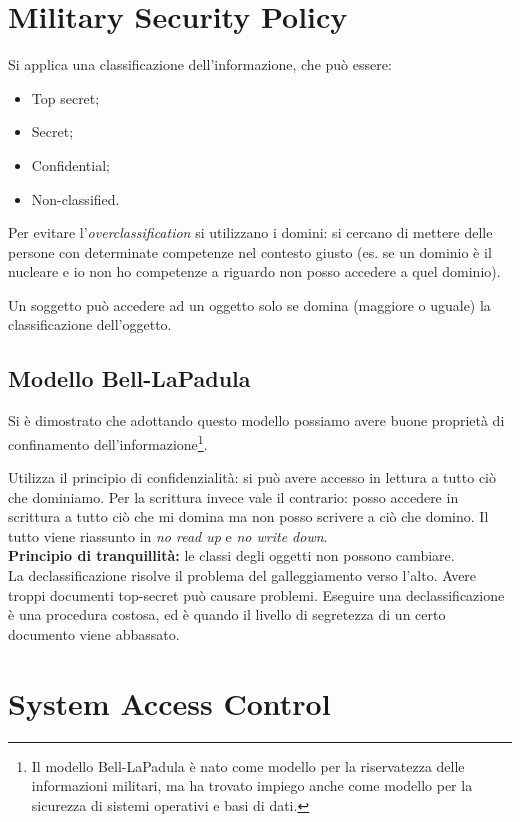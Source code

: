 \section{Military Security Policy}

Si applica una classificazione dell'informazione, che può essere:
\begin{itemize}
 \item Top secret;
 \item Secret;
 \item Confidential;
 \item Non-classified.
\end{itemize}

Per evitare l'\textit{overclassification} si utilizzano i domini: si cercano
di mettere delle persone con determinate competenze nel contesto giusto (es.
se un dominio è il nucleare e io non ho competenze a riguardo non posso
accedere a quel dominio).

Un soggetto può accedere ad un oggetto solo se domina (maggiore o uguale) la
classificazione dell'oggetto.

\subsection{Modello Bell-LaPadula}

Si è dimostrato che adottando questo modello possiamo avere buone proprietà di
confinamento dell'informazione\footnote{Il modello Bell-LaPadula è nato
come modello per la riservatezza delle informazioni militari, ma ha
trovato impiego anche come modello per la sicurezza di sistemi operativi
e basi di dati.}.

Utilizza il principio di confidenzialità: si può avere accesso in lettura a
tutto ciò che dominiamo. Per la scrittura invece vale il contrario: posso
accedere in scrittura a tutto ciò che mi domina ma non posso scrivere a ciò che
domino. Il tutto viene riassunto in \textit{no read up} e \textit{no write
down}.\\
\newline
\textbf{Principio di tranquillità:} le classi degli oggetti non possono
cambiare.\\
\newline
La declassificazione risolve il problema del galleggiamento verso l'alto. Avere
troppi documenti top-secret può causare problemi. Eseguire una
declassificazione è una procedura costosa, ed è quando il livello di segretezza
di un certo documento viene abbassato.

\section{System Access Control}

